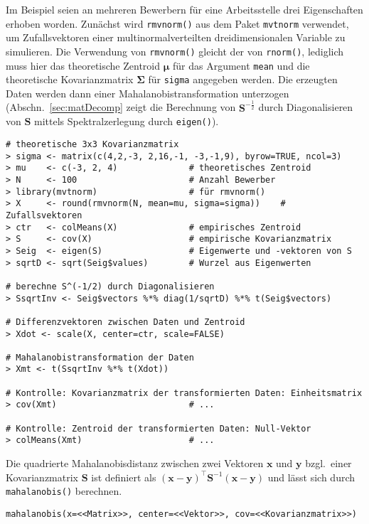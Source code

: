Im Beispiel seien an mehreren Bewerbern für eine Arbeitsstelle drei Eigenschaften erhoben worden. Zunächst wird \lstinline!rmvnorm()! aus dem Paket \lstinline!mvtnorm! verwendet, um Zufallsvektoren einer multinormalverteilten dreidimensionalen Variable zu simulieren. Die Verwendung von \lstinline!rmvnorm()! gleicht der von \lstinline!rnorm()!, lediglich muss hier das theoretische Zentroid $\bm{\mu}$ für das Argument \lstinline!mean! und die theoretische Kovarianzmatrix $\bm{\Sigma}$ für \lstinline!sigma! angegeben werden. Die erzeugten Daten werden dann einer Mahalanobistransformation unterzogen (Abschn.\ \ref{sec:matDecomp} zeigt die Berechnung von $\bm{S}^{-\frac{1}{2}}$ durch Diagonalisieren von $\bm{S}$ mittels Spektralzerlegung durch \lstinline!eigen()!).
\begin{lstlisting}
# theoretische 3x3 Kovarianzmatrix
> sigma <- matrix(c(4,2,-3, 2,16,-1, -3,-1,9), byrow=TRUE, ncol=3)
> mu    <- c(-3, 2, 4)              # theoretisches Zentroid
> N     <- 100                      # Anzahl Bewerber
> library(mvtnorm)                  # für rmvnorm()
> X     <- round(rmvnorm(N, mean=mu, sigma=sigma))    # Zufallsvektoren
> ctr   <- colMeans(X)              # empirisches Zentroid
> S     <- cov(X)                   # empirische Kovarianzmatrix
> Seig  <- eigen(S)                 # Eigenwerte und -vektoren von S
> sqrtD <- sqrt(Seig$values)        # Wurzel aus Eigenwerten

# berechne S^(-1/2) durch Diagonalisieren
> SsqrtInv <- Seig$vectors %*% diag(1/sqrtD) %*% t(Seig$vectors)

# Differenzvektoren zwischen Daten und Zentroid
> Xdot <- scale(X, center=ctr, scale=FALSE)

# Mahalanobistransformation der Daten
> Xmt <- t(SsqrtInv %*% t(Xdot))

# Kontrolle: Kovarianzmatrix der transformierten Daten: Einheitsmatrix
> cov(Xmt)                          # ...

# Kontrolle: Zentroid der transformierten Daten: Null-Vektor
> colMeans(Xmt)                     # ...
\end{lstlisting}

Die quadrierte Mahalanobisdistanz zwischen zwei Vektoren $\bm{x}$ und $\bm{y}$ bzgl.\ einer Kovarianzmatrix $\bm{S}$ ist definiert als $(\bm{x}-\bm{y})^{\top} \bm{S}^{-1} (\bm{x}-\bm{y})$ und lässt sich durch \lstinline!mahalanobis()! berechnen.
\begin{lstlisting}
mahalanobis(x=<<Matrix>>, center=<<Vektor>>, cov=<<Kovarianzmatrix>>)
\end{lstlisting}

